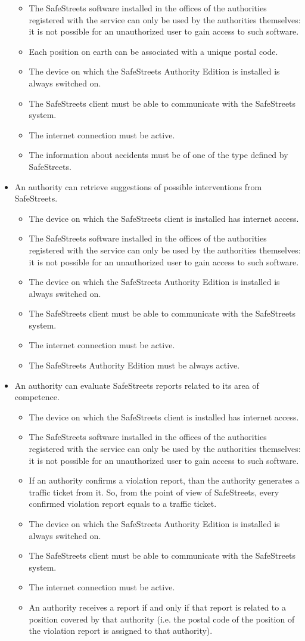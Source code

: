 \documentclass{article}
\newcommand\goal[1]{\item[{[G#1]}] }
\newcommand\requirement[1]{\item[{[R#1]}] }
\newcommand\assumption[1]{\item[{[A#1]}] }
\begin{document}
\begin{itemize}
\begin{itemize}
					\assumption{7} The SafeStreets software installed in the offices of the authorities registered with the service can only be used by the authorities 				themselves: it is not possible for an unauthorized user to gain access to such software.
					\assumption{8} Each position on earth can be associated with a unique postal code.
					\assumption{10} The device on which the SafeStreets Authority Edition is installed is always switched on.
				   \requirement{1} The SafeStreets client must be able to communicate with the SafeStreets system.
				   \requirement{2} The internet connection must be active.
				   \requirement{3} The information about accidents must be of one of the type defined by SafeStreets.
				\end{itemize}
				\goal{4}An authority can retrieve suggestions of possible interventions from SafeStreets.
				\begin{itemize}
					\assumption{1} The device on which the SafeStreets client is installed has internet access.
					\assumption{7} The SafeStreets software installed in the offices of the authorities registered with the service can only be used by the authorities 			themselves: it is not possible for an unauthorized user to gain access to such software.
					\assumption{10} The device on which the SafeStreets Authority Edition is installed is always switched on.
					\requirement{1} The SafeStreets client must be able to communicate with the SafeStreets system.
					\requirement{2} The internet connection must be active.
					\requirement{3} The SafeStreets Authority Edition must be always active.
				\end{itemize}
				\goal{5}An authority can evaluate SafeStreets reports related to its area of competence.
				\begin{itemize}
					\assumption{1} The device on which the SafeStreets client is installed has internet access.
					\assumption{7} The SafeStreets software installed in the offices of the authorities registered with the service can only be used by the authorities 			themselves: it is not possible for an unauthorized user to gain access to such software.
					\assumption{9} If an authority confirms a violation report, than the authority generates a traffic ticket from it. So, from the point of view of 				SafeStreets, every confirmed violation report equals to a traffic ticket.
					\assumption{10} The device on which the SafeStreets Authority Edition is installed is always switched on.
					\requirement{1} The SafeStreets client must be able to communicate with the SafeStreets system.
					\requirement{2} The internet connection must be active.
					\requirement{3} An authority receives a report if and only if that report is related to a position covered by that authority (i.e. the postal code of the position of the violation report is assigned to that authority).
				\end{itemize}
			\end{itemize}
		
\end{document}
